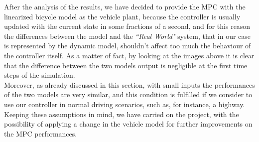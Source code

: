 After the analysis of the results, we have decided to provide the MPC with the linearized bicycle model as the vehicle plant, because the controller is usually updated with the current state in some fractions of a second, and for this reason the differences between the model and the \textit{``Real World"} system, that in our case is represented by the dynamic model, shouldn't affect too much the behaviour of the controller itself. As a matter of fact, by looking at the images above it is clear that the difference between the two models output is negligible at the first time steps of the simulation.\\
Moreover, as already discussed in this section, with small inputs the performances of the two models are very similar, and this condition is fulfilled if we consider to use our controller in normal driving scenarios, such as, for instance, a highway.\\
Keeping these assumptions in mind, we have carried on the project, with the possibility of applying a change in the vehicle model for further improvements on the MPC performances.